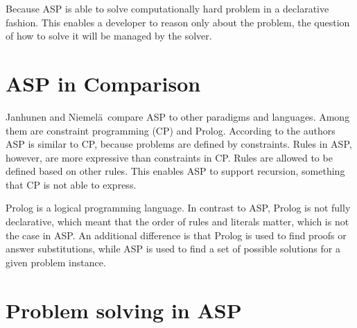 \documentclass[runningheads]{llncs}
\newcommand{\authorquote}{Janhunen and Niemelä~}
\begin{document}

Because ASP is able to solve computationally hard problem in a declarative fashion. This enables a developer to reason only about the problem, the question of how to solve it will be managed by the solver. 




\section{ASP in Comparison}

\authorquote compare ASP to other paradigms and languages. Among them are constraint programming (CP) and Prolog. According to the authors ASP is similar to CP, because problems are defined by constraints. Rules in ASP, however, are more expressive than constraints in CP. Rules are allowed to be defined based on other rules. This enables ASP to support recursion, something that CP is not able to express. 

Prolog is a logical programming language. In contrast to ASP, Prolog is not fully declarative, which meant that the order of rules and literals matter, which is not the case in ASP. An additional difference is that Prolog is used to find proofs or answer substitutions, while ASP is used to find a set of possible solutions for a given problem instance.


\begin{comment}
\begin{itemize}
     \item Prolog vs. ASP: Prolog is logic programming. ASP is fully declarative, so order of rules/literals does not matter. Prolog is used to find proofs or answer substitutions, while ASP is used to find the complete solution. 
   \item ASP similar to constraint programming (CP), because problems are defined by constraints and systems try to find solutions to that. ASP allows to construct a rule out of simpler rules and having rules also allows for things that are not possible in CP, like recursive constraints. 
\end{itemize}
\end{comment}




\section{Problem solving in ASP}
\end{document}
